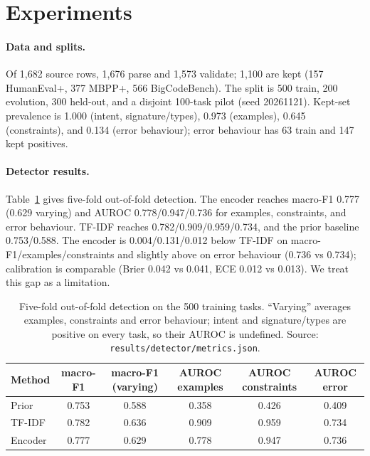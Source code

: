 \documentclass{article}
\begin{document}
\section{Experiments}

\paragraph{Data and splits.}
Of 1{,}682 source rows, 1{,}676 parse and 1{,}573 validate; 1{,}100 are kept (157 HumanEval+,
377 MBPP+, 566 BigCodeBench). The split is 500 train, 200 evolution, 300
held-out, and a disjoint 100-task pilot (seed 20261121). Kept-set prevalence is 1.000 (intent,
signature/types), 0.973 (examples), 0.645 (constraints), and 0.134 (error behaviour); error
behaviour has 63 train and 147 kept positives.

\paragraph{Detector results.}
Table~\ref{tab:detector} gives five-fold out-of-fold detection. The
encoder reaches macro-F1 0.777 (0.629 varying) and AUROC 0.778/0.947/0.736 for examples,
constraints, and error behaviour. TF-IDF reaches 0.782/0.909/0.959/0.734, and the prior baseline 0.753/0.588. The encoder is 0.004/0.131/0.012 below TF-IDF on
macro-F1/examples/constraints and slightly above on error behaviour (0.736 vs 0.734);
calibration is comparable (Brier 0.042 vs 0.041, ECE 0.012 vs 0.013). We treat this gap as a
limitation.

\begin{table}[!ht]
  \centering
  \footnotesize
  \setlength{\tabcolsep}{4pt}
  \begin{tabular}{@{}lccccc@{}}
    \toprule
    Method & macro-F1 & macro-F1 (varying) & AUROC examples & AUROC constraints & AUROC error \\
    \midrule
    Prior & 0.753 & 0.588 & 0.358 & 0.426 & 0.409 \\
    TF-IDF & 0.782 & 0.636 & 0.909 & 0.959 & 0.734 \\
    Encoder & 0.777 & 0.629 & 0.778 & 0.947 & 0.736 \\
    \bottomrule
  \end{tabular}
  \caption{Five-fold out-of-fold detection on the 500 training tasks. ``Varying'' averages
  examples, constraints and error behaviour; intent and signature/types are positive on every
  task, so their AUROC is undefined. Source: \texttt{results/detector/metrics.json}.}
  \label{tab:detector}
\end{table}
\end{document}
